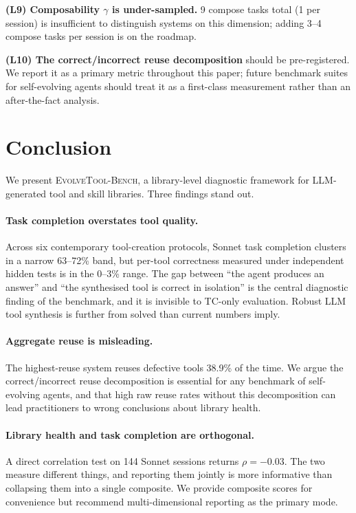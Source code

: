 \documentclass[sigplan,nonacm,natbib=false]{acmart}
\begin{document}
\noindent\textbf{(L9) Composability $\gamma$ is under-sampled.} 9 compose tasks total (1 per session) is insufficient to distinguish systems on this dimension; adding 3--4 compose tasks per session is on the roadmap.

\noindent\textbf{(L10) The correct/incorrect reuse decomposition} should be pre-registered. We report it as a primary metric throughout this paper; future benchmark suites for self-evolving agents should treat it as a first-class measurement rather than an after-the-fact analysis.

\section{Conclusion}

We present \textsc{EvolveTool-Bench}, a library-level diagnostic framework for LLM-generated tool and skill libraries. Three findings stand out.

\paragraph{Task completion overstates tool quality.} Across six contemporary tool-creation protocols, Sonnet task completion clusters in a narrow 63--72\% band, but per-tool correctness measured under independent hidden tests is in the 0--3\% range. The gap between ``the agent produces an answer'' and ``the synthesised tool is correct in isolation'' is the central diagnostic finding of the benchmark, and it is invisible to TC-only evaluation. Robust LLM tool synthesis is further from solved than current numbers imply.

\paragraph{Aggregate reuse is misleading.} The highest-reuse system reuses defective tools 38.9\% of the time. We argue the correct/incorrect reuse decomposition is essential for any benchmark of self-evolving agents, and that high raw reuse rates without this decomposition can lead practitioners to wrong conclusions about library health.

\paragraph{Library health and task completion are orthogonal.} A direct correlation test on 144 Sonnet sessions returns $\rho = -0.03$. The two measure different things, and reporting them jointly is more informative than collapsing them into a single composite. We provide composite scores for convenience but recommend multi-dimensional reporting as the primary mode.
\end{document}
